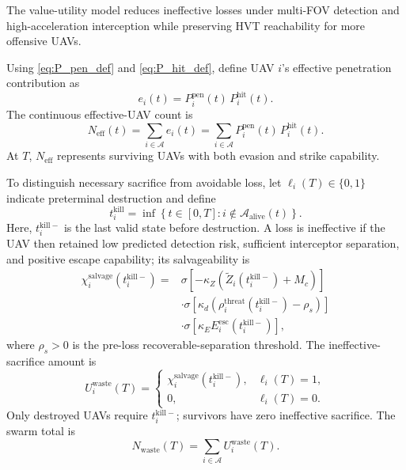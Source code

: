 \documentclass{cja}
\begin{document}
The value-utility model reduces ineffective losses under multi-FOV detection and high-acceleration interception while preserving HVT reachability for more offensive UAVs.

Using \eqref{eq:P_pen_def} and \eqref{eq:P_hit_def}, define UAV $i$'s effective penetration contribution as
\begin{equation}
e_i(t)
=
P_i^{\mathrm{pen}}(t)\,P_i^{\mathrm{hit}}(t).
\end{equation}
The continuous effective-UAV count is
\begin{equation}
N_{\mathrm{eff}}(t)
=
\sum_{i\in\mathcal{A}} e_i(t)
=
\sum_{i\in\mathcal{A}} P_i^{\mathrm{pen}}(t)\,P_i^{\mathrm{hit}}(t).
\end{equation}
At $T$, $N_{\mathrm{eff}}$ represents surviving UAVs with both evasion and strike capability.

To distinguish necessary sacrifice from avoidable loss, let $\ell_i(T)\in\{0,1\}$ indicate preterminal destruction and define
\begin{equation}
t_i^{\mathrm{kill}}
=
\inf\left\{
t\in[0,T]:
i\notin\mathcal A_{\mathrm{alive}}(t)
\right\}.
\end{equation}
Here, $t_i^{\mathrm{kill}-}$ is the last valid state before destruction. A loss is ineffective if the UAV then retained low predicted detection risk, sufficient interceptor separation, and positive escape capability; its salvageability is
\begin{equation}
\begin{aligned}
\chi_i^{\mathrm{salvage}}\!\left(t_i^{\mathrm{kill}-}\right)
={}&
\sigma\!\left[-\kappa_Z\left(\widetilde Z_i\!\left(t_i^{\mathrm{kill}-}\right)+M_c\right)\right]\\
&\cdot
\sigma\!\left[\kappa_d\left(\rho_i^{\mathrm{threat}}\!\left(t_i^{\mathrm{kill}-}\right)-\rho_s\right)\right]\\
&\cdot
\sigma\!\left[\kappa_E E_i^{\mathrm{esc}}\!\left(t_i^{\mathrm{kill}-}\right)\right],
\end{aligned}
\end{equation}
where $\rho_s>0$ is the pre-loss recoverable-separation threshold. The ineffective-sacrifice amount is
\begin{equation}
U_i^{\mathrm{waste}}(T)
=
\begin{cases}
\chi_i^{\mathrm{salvage}}\!\left(t_i^{\mathrm{kill}-}\right),
&
\ell_i(T)=1,\\[2mm]
0,
&
\ell_i(T)=0.
\end{cases}
\end{equation}
Only destroyed UAVs require $t_i^{\mathrm{kill}-}$; survivors have zero ineffective sacrifice. The swarm total is
\begin{equation}
N_{\mathrm{waste}}(T)
=
\sum_{i\in\mathcal{A}} U_i^{\mathrm{waste}}(T).
\end{equation}
\end{document}
